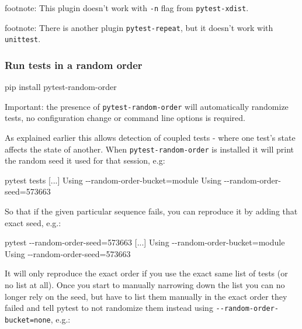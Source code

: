 \documentclass[
]{report}
\newenvironment{Shaded}{\begin{snugshade}}{\end{snugshade}}
\newcommand{\AttributeTok}[1]{\textcolor[rgb]{0.40,0.45,0.13}{#1}}
\newcommand{\ExtensionTok}[1]{\textcolor[rgb]{0.00,0.23,0.31}{#1}}
\newcommand{\NormalTok}[1]{\textcolor[rgb]{0.00,0.23,0.31}{#1}}
\newcommand{\OperatorTok}[1]{\textcolor[rgb]{0.37,0.37,0.37}{#1}}
\begin{document}
footnote: This plugin doesn't work with \texttt{-n} flag from
\texttt{pytest-xdist}.

footnote: There is another plugin \texttt{pytest-repeat}, but it doesn't
work with \texttt{unittest}.

\subsubsection{Run tests in a random
order}\label{run-tests-in-a-random-order}

\begin{Shaded}
\begin{Highlighting}[]
\ExtensionTok{pip}\NormalTok{ install pytest{-}random{-}order}
\end{Highlighting}
\end{Shaded}

Important: the presence of \texttt{pytest-random-order} will
automatically randomize tests, no configuration change or command line
options is required.

As explained earlier this allows detection of coupled tests - where one
test's state affects the state of another. When
\texttt{pytest-random-order} is installed it will print the random seed
it used for that session, e.g:

\begin{Shaded}
\begin{Highlighting}[]
\ExtensionTok{pytest}\NormalTok{ tests}
\ExtensionTok{[...]}
\ExtensionTok{Using} \AttributeTok{{-}{-}random{-}order{-}bucket}\OperatorTok{=}\NormalTok{module}
\ExtensionTok{Using} \AttributeTok{{-}{-}random{-}order{-}seed}\OperatorTok{=}\NormalTok{573663}
\end{Highlighting}
\end{Shaded}

So that if the given particular sequence fails, you can reproduce it by
adding that exact seed, e.g.:

\begin{Shaded}
\begin{Highlighting}[]
\ExtensionTok{pytest} \AttributeTok{{-}{-}random{-}order{-}seed}\OperatorTok{=}\NormalTok{573663}
\ExtensionTok{[...]}
\ExtensionTok{Using} \AttributeTok{{-}{-}random{-}order{-}bucket}\OperatorTok{=}\NormalTok{module}
\ExtensionTok{Using} \AttributeTok{{-}{-}random{-}order{-}seed}\OperatorTok{=}\NormalTok{573663}
\end{Highlighting}
\end{Shaded}

It will only reproduce the exact order if you use the exact same list of
tests (or no list at all). Once you start to manually narrowing down the
list you can no longer rely on the seed, but have to list them manually
in the exact order they failed and tell pytest to not randomize them
instead using \texttt{-\/-random-order-bucket=none}, e.g.:
\end{document}
